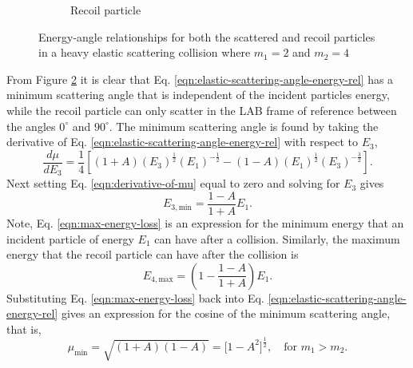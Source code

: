 \documentclass[../main.tex]{subfiles}
\begin{document}
\begin{figure}[!htb]
\begin{subfigure}{.5\textwidth}
    \caption{Recoil particle}
    \label{fig:heavy-elastic-energy-angle-recoil}
  \end{subfigure}
  \caption{Energy-angle relationships for both the scattered and recoil particles in a heavy elastic scattering collision where $m_1 = 2$ and $m_2 = 4$}
  \label{fig:heavy-elastic-energy-angle}
\end{figure}

From Figure \ref{fig:heavy-elastic-energy-angle} it is clear that Eq. \eqref{eqn:elastic-scattering-angle-energy-rel} has a minimum scattering angle that is independent of the incident particles energy, while the recoil particle can only scatter in the LAB frame of reference between the angles $0^{\circ}$ and $90^{\circ}$. The minimum scattering angle is found by taking the derivative of Eq. \eqref{eqn:elastic-scattering-angle-energy-rel} with respect to $E_{3}$,
\begin{equation} \label{eqn:derivative-of-mu}
  \dfrac{d \mu}{d E_{3}} = \dfrac{1}{4} \left[\left(1 + A\right)(E_{3})^{\frac{1}{2}}(E_{1})^{-\frac{1}{2}} - \left(1 - A\right)(E_{1})^{\frac{1}{2}}(E_{3})^{-\frac{3}{2}}\right].
\end{equation}
Next setting Eq. \eqref{eqn:derivative-of-mu} equal to zero and solving for $E_{3}$ gives
\begin{equation} \label{eqn:max-energy-loss}
  E_{3,\text{min}} = \dfrac{1-A}{1+A} E_{1}.
\end{equation}
Note, Eq. \eqref{eqn:max-energy-loss} is an expression for the minimum energy that an incident particle of energy $E_1$ can have after a collision. Similarly, the maximum energy that the recoil particle can have after the collision is
\begin{equation}
  E_{4,\text{max}} = \left(1 - \dfrac{1-A}{1+A}\right) E_{1}.
\end{equation}
Substituting Eq. \eqref{eqn:max-energy-loss} back into Eq. \eqref{eqn:elastic-scattering-angle-energy-rel} gives an expression for the cosine of the minimum scattering angle, that is,
\begin{equation}
  \mu_{\text{min}} = \sqrt{(1+A)(1-A)} = \Big[1 - A^2\Big]^{\frac{1}{2}}, \quad \text{for} \,\, m_{1} > m_{2}.
\end{equation}
\end{document}
